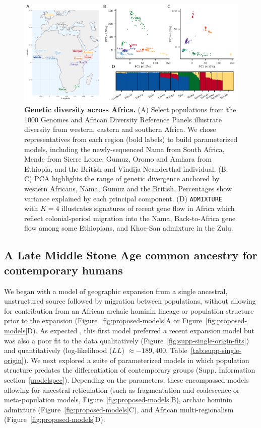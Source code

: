 \documentclass[]{article}
\begin{document}
\begin{figure}[ht!]
    \centering
    \includegraphics{figures/samples-diversity.pdf}
    \caption[width=\textwidth]{
        \textbf{Genetic diversity across Africa.}
        (A) Select populations from the 1000 Genomes and African Diversity Reference Panels
        illustrate diversity from western, eastern and southern Africa.
        We chose representatives from each region (bold labels)
        to build parameterized models,
        including the newly-sequenced Nama from South Africa, Mende
        from Sierre Leone, Gumuz, Oromo and Amhara from Ethiopia, and the
        British and Vindija Neanderthal individual.
        (B, C) PCA highlights the range of genetic divergence anchored 
        by western Africans, Nama, Gumuz and the British.
        Percentages show variance explained by each principal component.
        (D) \texttt{ADMIXTURE} with $K=4$ illustrates signatures of recent gene flow in Africa
        which reflect colonial-period migration into the Nama,
        Back-to-Africa gene flow among some Ethiopians, and Khoe-San admixture in the Zulu.
    }
    \label{fig:diversity}
\end{figure}
   
\subsection*{A Late Middle Stone Age common ancestry for contemporary humans}

We began with a model of geographic expansion from a single ancestral,
unstructured source followed by migration between populations, without allowing
for contribution from an African archaic hominin lineage or population structure prior
to the expansion (Figure~\ref{fig:proposed-models}A or Figure~\ref{fig:proposed-models}D). As expected
\citep{Ragsdale2019-nt}, this first model preferred a recent expansion model but was also a poor fit to the data
qualitatively (Figure~\ref{fig:supp-single-origin-fits}) and quantitatively
(log-likelihood ($LL$) $\approx -189,400$, Table~\ref{tab:supp-single-origin}).
We next explored a suite of parameterized models in which population structure predates the
differentiation of contemporary groups (Supp. Information section~\ref{modelspec}). 
Depending on the parameters, these encompassed models allowing for ancestral
reticulation (such as fragmentation-and-coalescence or meta-population models,
Figure~\ref{fig:proposed-models}B), archaic hominin admixture
(Figure~\ref{fig:proposed-models}C), and African multi-regionalism
(Figure~\ref{fig:proposed-models}D).
\end{document}
